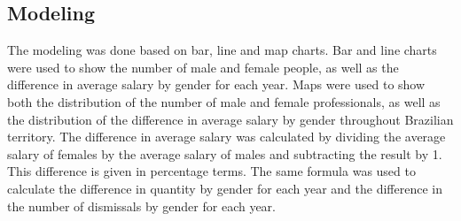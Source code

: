 \subsection{Modeling}

The modeling was done based on bar, line and map charts. Bar and line charts were used to show the number of male and female people, as well as the difference in average salary by gender for each year. Maps were used to show both the distribution of the number of male and female professionals, as well as the distribution of the difference in average salary by gender throughout Brazilian territory. The difference in average salary was calculated by dividing the average salary of females by the average salary of males and subtracting the result by 1. This difference is given in percentage terms. The same formula was used to calculate the difference in quantity by gender for each year and the difference in the number of dismissals by gender for each year.
